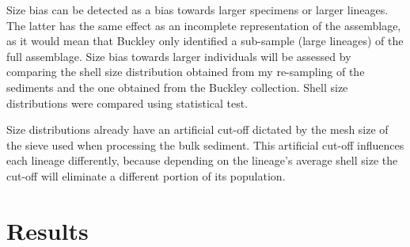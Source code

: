 \documentclass[a4paper]{article}
\begin{document}
	
Size bias can be detected as a bias towards larger specimens or larger lineages. The latter has the same effect as an incomplete representation of the assemblage, as it would mean that Buckley only identified a sub-sample (large lineages) of the full assemblage. Size bias towards larger individuals will be assessed by comparing the shell size distribution obtained from my re-sampling of the sediments and the one obtained from the Buckley collection. Shell size distributions were compared using statistical test. 


Size distributions already have an artificial cut-off dictated by the mesh size of the sieve used when processing the bulk sediment. This artificial cut-off influences each lineage differently, because depending on the lineage’s average shell size the cut-off will eliminate a different portion of its population. %




\section{Results}
\end{document}
